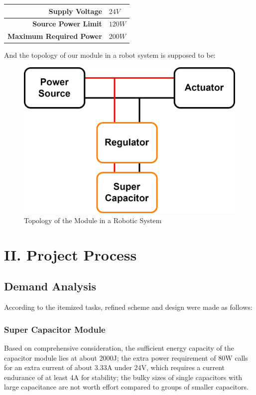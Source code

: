 \documentclass[a4paper,num-refs]{oup-contemporary}
\begin{document}
\begin{table}[h]
	\begin{center}
		\begin{tabular}{r l}
			\textbf{Supply Voltage} & $ 24V $ \\
			\hline
			\textbf{Source Power Limit} & $ 120W $ \\
			\hline
			\textbf{Maximum Required Power}& $ 200W $ \\
		\end{tabular}
	\end{center}
\end{table} 

And the topology of our module in a robot system is supposed to be:
\begin{figure}[h]
	\centering
	\includegraphics[width=0.5\linewidth]{ChassisTopology.png}
	\caption{Topology of the Module in a Robotic System}
\end{figure} 

\section{II. Project Process}
\subsection{Demand Analysis}
According to the itemized tasks, refined scheme and design were made as follows:

\subsubsection{Super Capacitor Module}
Based on comprehensive consideration, the sufficient energy capacity of the capacitor module lies at about 2000J; the extra power requirement of 80W calls for an extra current of about 3.33A under 24V, which requires a current endurance of at least 4A for stability; the bulky sizes of single capacitors with large capacitance are not worth effort compared to groups of smaller capacitors.
\end{document}
